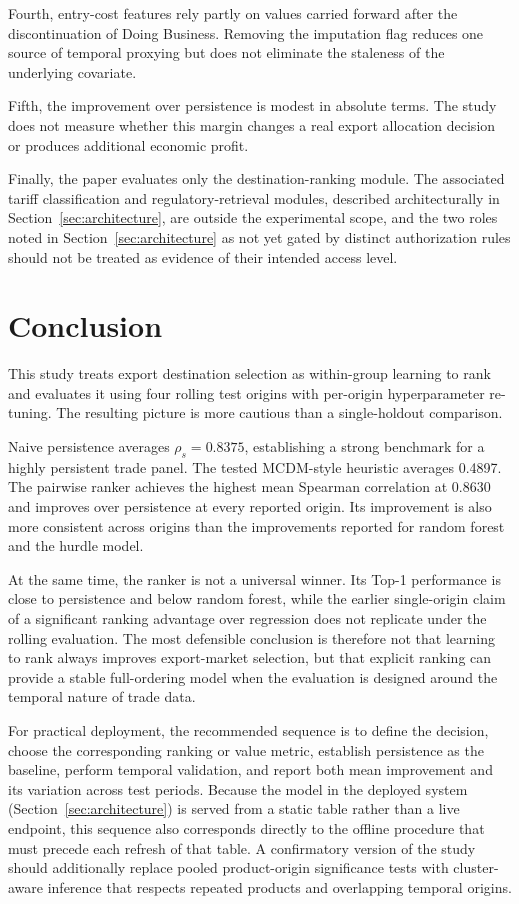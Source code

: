 \documentclass[conference]{IEEEtran}
\begin{document}
Fourth, entry-cost features rely partly on values carried forward after the discontinuation of Doing Business. Removing the imputation flag reduces one source of temporal proxying but does not eliminate the staleness of the underlying covariate.

Fifth, the improvement over persistence is modest in absolute terms. The study does not measure whether this margin changes a real export allocation decision or produces additional economic profit.

Finally, the paper evaluates only the destination-ranking module. The associated tariff classification and regulatory-retrieval modules, described architecturally in Section~\ref{sec:architecture}, are outside the experimental scope, and the two roles noted in Section~\ref{sec:architecture} as not yet gated by distinct authorization rules should not be treated as evidence of their intended access level.

\section{Conclusion}

This study treats export destination selection as within-group learning to rank and evaluates it using four rolling test origins with per-origin hyperparameter re-tuning. The resulting picture is more cautious than a single-holdout comparison.

Naive persistence averages $\rho_s=0.8375$, establishing a strong benchmark for a highly persistent trade panel. The tested MCDM-style heuristic averages 0.4897. The pairwise ranker achieves the highest mean Spearman correlation at 0.8630 and improves over persistence at every reported origin. Its improvement is also more consistent across origins than the improvements reported for random forest and the hurdle model.

At the same time, the ranker is not a universal winner. Its Top-1 performance is close to persistence and below random forest, while the earlier single-origin claim of a significant ranking advantage over regression does not replicate under the rolling evaluation. The most defensible conclusion is therefore not that learning to rank always improves export-market selection, but that explicit ranking can provide a stable full-ordering model when the evaluation is designed around the temporal nature of trade data.

For practical deployment, the recommended sequence is to define the decision, choose the corresponding ranking or value metric, establish persistence as the baseline, perform temporal validation, and report both mean improvement and its variation across test periods. Because the model in the deployed system (Section~\ref{sec:architecture}) is served from a static table rather than a live endpoint, this sequence also corresponds directly to the offline procedure that must precede each refresh of that table. A confirmatory version of the study should additionally replace pooled product-origin significance tests with cluster-aware inference that respects repeated products and overlapping temporal origins.
\end{document}
